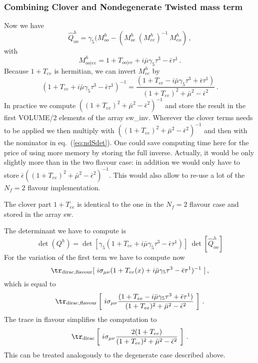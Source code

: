 \subsubsection{Combining Clover and Nondegenerate Twisted mass term}

Now we have
\[
\hat Q^h_{oo} = \gamma_5(M_{oo}^h -
(M_{oe}^h\ (M_{ee}^h)^{-1}\ M_{eo}^h)\,,
\]
with
\begin{equation}
  M_{oo|ee}^h = 1+T_{oo|ee}+i\bar\mu\gamma_5\tau^3-\bar\epsilon\tau^1\,.
\end{equation}
Because $1+T_{ee}$ is hermitian, we can invert $M_{ee}^h$ by
\begin{equation}
  \label{eq:ndSdet}
  (1+T_{ee}+i\bar\mu\gamma_5\tau^3-\bar\epsilon\tau^1)^{-1} =
  \frac{(1+T_{ee}-i\bar\mu\gamma_5\tau^3+\bar\epsilon\tau^1)}
  {(1+T_{ee})^2 + \bar\mu^2 - \bar\epsilon^2}\,.
\end{equation}
In practice we compute $((1+T_{ee})^2 + \bar\mu^2 -
\bar\epsilon^2)^{-1}$ and store the result in the first {\ttfamily
  VOLUME/2} elements of the array {\ttfamily sw\_inv}. Wherever the
clover terms needs to be applied we then multiply with  $((1+T_{ee})^2
+ \bar\mu^2 - \bar\epsilon^2)^{-1}$ and then with the nominator in
eq.~(\ref{eq:ndSdet}). One could save computing time here for the
price of using more memory by storing the full inverse. Actually, it
would be only slightly more than in the two flavour case: in addition
we would only have to store $\bar\epsilon((1+T_{ee})^2
+ \bar\mu^2 - \bar\epsilon^2)^{-1}$. This would also allow to re-use a
lot of the $N_f=2$ flavour implementation.

The clover part $1+T_{ee}$ is identical to the one in the $N_f=2$
flavour case and stored in the array {\ttfamily sw}. 

The determinant we have to compute is
\[
\det(Q^h) =
\det[\gamma_5(1+T_{ee}+i\bar\mu\gamma_5\tau^3-\bar\epsilon\tau^1)]\
\det[\hat Q^h_{oo}]
\]
For the variation of the first term we have to compute now
\begin{equation}
  \label{eq:ndtrdiracdet}
  \tr_\mathrm{dirac, flavour}[\ i\sigma_{\mu\nu}(1+T_{ee}(x) +
  i\bar\mu\gamma_5\tau^3 - \bar\epsilon\tau^1)^{-1}\ ]\, ,
\end{equation}
which is equal to
\begin{equation}
 \tr_\mathrm{dirac,flavour}\left[\ i\sigma_{\mu\nu}
   \frac{(1+T_{ee}-i\bar\mu\gamma_5\tau^3+\bar\epsilon\tau^1)}
  {(1+T_{ee})^2 + \bar\mu^2 - \bar\epsilon^2}\ \right]\,.
\end{equation}
The trace in flavour simplifies the computation to
\begin{equation}
 \tr_\mathrm{dirac}\left[\ i\sigma_{\mu\nu}
   \frac{2(1+T_{ee})}
  {(1+T_{ee})^2 + \bar\mu^2 - \bar\epsilon^2}\ \right]\,.
\end{equation}
This can be treated analogously to the degenerate case described
above.


